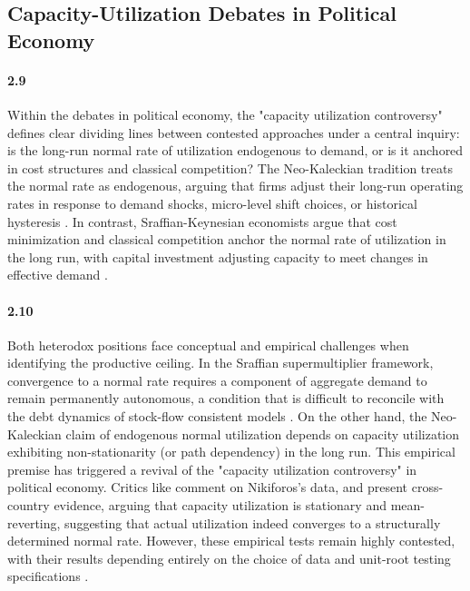 \subsection{Capacity-Utilization Debates in Political Economy}
\label{subsec:pe_utilization_debates}

\paragraph{2.9}
Within the debates in political economy, the "capacity utilization controversy" defines clear dividing lines between contested approaches under a central inquiry: is the long-run normal rate of utilization endogenous to demand, or is it anchored in cost structures and classical competition? The Neo-Kaleckian tradition treats the normal rate as endogenous, arguing that firms adjust their long-run operating rates in response to demand shocks, micro-level shift choices, or historical hysteresis \citep{Lavoie1995, Nikiforos2013, Setterfield2020}. In contrast, Sraffian-Keynesian economists argue that cost minimization and classical competition anchor the normal rate of utilization in the long run, with capital investment adjusting capacity to meet changes in effective demand \citep{Ciccone1986, Kurz1986}.

\paragraph{2.10}
Both heterodox positions face conceptual and empirical challenges when identifying the productive ceiling. In the Sraffian supermultiplier framework, convergence to a normal rate requires a component of aggregate demand to remain permanently autonomous, a condition that is difficult to reconcile with the debt dynamics of stock-flow consistent models \citep{Nikiforos2018}. On the other hand, the Neo-Kaleckian claim of endogenous normal utilization depends on capacity utilization exhibiting non-stationarity (or path dependency) in the long run. This empirical premise has triggered a revival of the "capacity utilization controversy" in political economy. Critics like \citet{GahnGonzalez2020} comment on Nikiforos's data, and \citet{GahnGonzalez2022} present cross-country evidence, arguing that capacity utilization is stationary and mean-reverting, suggesting that actual utilization indeed converges to a structurally determined normal rate. However, these empirical tests remain highly contested, with their results depending entirely on the choice of data and unit-root testing specifications \citep{Nikiforos2020}.

